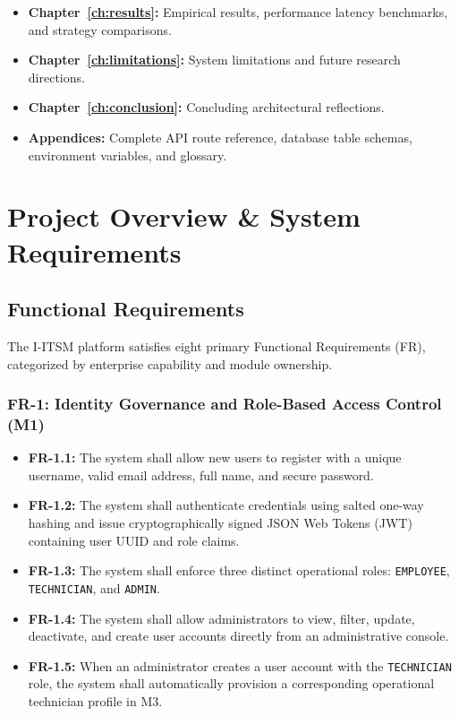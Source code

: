 \documentclass[11pt,a4paper,oneside]{report}
\begin{document}
\begin{itemize}
    \item \textbf{Chapter~\ref{ch:results}:} Empirical results, performance latency benchmarks, and strategy comparisons.
    \item \textbf{Chapter~\ref{ch:limitations}:} System limitations and future research directions.
    \item \textbf{Chapter~\ref{ch:conclusion}:} Concluding architectural reflections.
    \item \textbf{Appendices:} Complete API route reference, database table schemas, environment variables, and glossary.
\end{itemize}


\chapter{Project Overview \& System Requirements}
\label{ch:requirements}

\section{Functional Requirements}
\label{sec:req_functional}
The I-ITSM platform satisfies eight primary Functional Requirements (FR), categorized by enterprise capability and module ownership.

\subsection{FR-1: Identity Governance and Role-Based Access Control (M1)}
\begin{itemize}
    \item \textbf{FR-1.1:} The system shall allow new users to register with a unique username, valid email address, full name, and secure password.
    \item \textbf{FR-1.2:} The system shall authenticate credentials using salted one-way hashing and issue cryptographically signed JSON Web Tokens (JWT) containing user UUID and role claims.
    \item \textbf{FR-1.3:} The system shall enforce three distinct operational roles: \texttt{EMPLOYEE}, \texttt{TECHNICIAN}, and \texttt{ADMIN}.
    \item \textbf{FR-1.4:} The system shall allow administrators to view, filter, update, deactivate, and create user accounts directly from an administrative console.
    \item \textbf{FR-1.5:} When an administrator creates a user account with the \texttt{TECHNICIAN} role, the system shall automatically provision a corresponding operational technician profile in M3.
\end{itemize}
\end{document}
